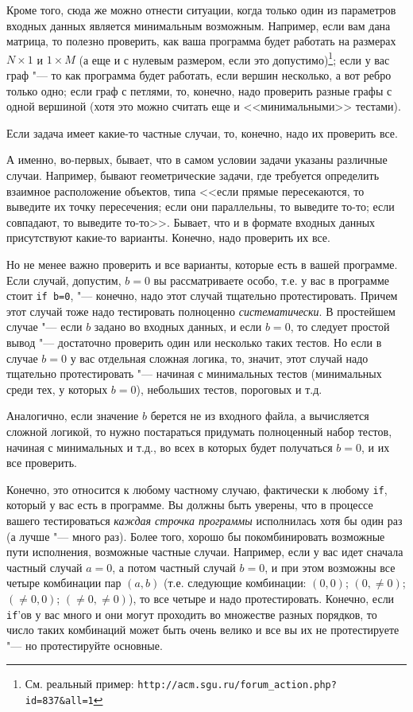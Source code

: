 \documentclass[a4paper,10pt]{problems}
\begin{document}
Кроме того, сюда же можно отнести ситуации, когда только один из параметров входных данных является минимальным возможным. 
Например, если вам дана матрица, то полезно проверить, как ваша программа будет работать на размерах $N\times 1$ и $1\times M$ 
(а еще и с нулевым размером, если это допустимо)\footnote{См. реальный пример: \verb`http://acm.sgu.ru/forum_action.php?id=837&all=1`}; 
если у вас граф "--- то как программа будет работать, если вершин несколько, а вот ребро только одно;
если граф с петлями, то, конечно, надо проверить разные графы с одной вершиной (хотя это можно считать еще и <<минимальными>> тестами).

Если задача имеет какие-то частные случаи, то, конечно, надо их проверить все. 

А именно, во-первых, бывает, что в самом условии задачи указаны различные случаи.
Например, бывают геометрические задачи, где требуется определить взаимное расположение объектов, типа <<если прямые пересекаются, то выведите их точку пересечения;
если они параллельны, то выведите то-то; если совпадают, то выведите то-то>>. 
Бывает, что и в формате входных данных присутствуют какие-то варианты.
Конечно, надо проверить их все.

Но не менее важно проверить и все варианты, которые есть в вашей программе. Если случай, допустим, $b=0$ вы рассматриваете особо, 
т.е. у вас в программе стоит \verb`if b=0`, "--- конечно, надо этот случай тщательно протестировать. 
Причем этот случай тоже надо тестировать полноценно \textit{систематически}. 
В простейшем случае "--- если $b$ задано во входных данных, и если $b=0$, то следует простой вывод "--- достаточно проверить один или несколько таких тестов.
Но если в случае $b=0$ у вас отдельная сложная логика, то, значит, этот случай надо тщательно протестировать "--- начиная с минимальных тестов 
(минимальных среди тех, у которых $b=0$), небольших тестов, пороговых и т.д.

Аналогично, если значение $b$ берется не из входного файла, а вычисляется сложной логикой, то нужно постараться придумать полноценный набор тестов,
начиная с минимальных и т.д., во всех в которых будет получаться $b=0$, и их все проверить.

Конечно, это относится к любому частному случаю, фактически к любому \verb`if`, который у вас есть в программе. 
Вы должны быть уверены, что в процессе вашего тестироваться \textit{каждая строчка программы} исполнилась хотя бы один раз (а лучше "--- много раз).
Более того, хорошо бы покомбинировать возможные пути исполнения, возможные частные случаи. 
Например, если у вас идет сначала частный случай $a=0$, а потом частный случай $b=0$, и при этом возможны все четыре комбинации пар $(a,b)$ 
(т.е. следующие комбинации: $(0,0)$; $(0, \neq 0)$; $(\neq 0, 0)$; $(\neq 0, \neq 0)$), то все четыре и надо протестировать.
Конечно, если \verb`if`'ов у вас много и они могут проходить во множестве разных порядков, то число таких комбинаций может быть очень велико
и все вы их не протестируете "--- но протестируйте основные.
\end{document}
